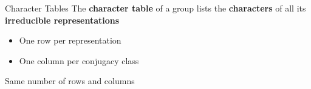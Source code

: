 \begin{frame}{Character Tables}
    \large
    The \textbf{character table} of a group lists the \textbf{characters} of all its \textbf{irreducible representations}
    
    \pause
    \vspace{1em}
    \begin{itemize}
        \item One row per representation \pause
        \item One column per conjugacy class
    \end{itemize}
    
    \vspace{1em}
    \pause
    Same number of rows and columns

    \vspace{1em}
    \normalsize
    {\hspace*{\fill} \cite{fulton2013}}

\end{frame}
